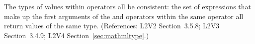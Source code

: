 The types of values within  operators  all
be consistent: the set of expressions that make up the first
arguments of the  and  operators
within the same  operator  all return
values of the same type.  (References: L2V2 Section~3.5.8; L2V3 
Section~3.4.9; L2V4 Section~\ref{sec:mathmltype}.)
